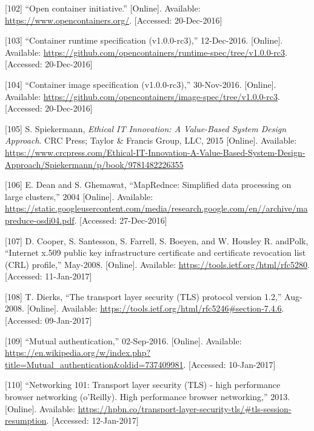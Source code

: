 \documentclass[12pt,english,a4paper,titlepage,cleardoublepage=empty,dottedtoc]{report}
\begin{document}
\hypertarget{ref-web_2016_open-container-initiative}{}
{[}102{]} ``Open container initiative.'' {[}Online{]}. Available:
\url{https://www.opencontainers.org/}. {[}Accessed: 20-Dec-2016{]}

\hypertarget{ref-web_oci-spec_runtime}{}
{[}103{]} ``Container runtime specification (v1.0.0-rc3),'' 12-Dec-2016.
{[}Online{]}. Available:
\url{https://github.com/opencontainers/runtime-spec/tree/v1.0.0-rc3}.
{[}Accessed: 20-Dec-2016{]}

\hypertarget{ref-web_oci-spec_image}{}
{[}104{]} ``Container image specification (v1.0.0-rc3),'' 30-Nov-2016.
{[}Online{]}. Available:
\url{https://github.com/opencontainers/image-spec/tree/v1.0.0-rc3}.
{[}Accessed: 20-Dec-2016{]}

\hypertarget{ref-book_2015_ethical-it-innovation}{}
{[}105{]} S. Spiekermann, \emph{Ethical IT Innovation: A Value-Based
System Design Approach}. CRC Press; Taylor \& Francis Group, LLC, 2015
{[}Online{]}. Available:
\url{https://www.crcpress.com/Ethical-IT-Innovation-A-Value-Based-System-Design-Approach/Spiekermann/p/book/9781482226355}

\hypertarget{ref-paper_2004_distributed-mapreduce}{}
{[}106{]} E. Dean and S. Ghemawat, ``MapRednce: Simplified data
processing on large clusters,'' 2004 {[}Online{]}. Available:
\url{https://static.googleusercontent.com/media/research.google.com/en//archive/mapreduce-osdi04.pdf}.
{[}Accessed: 27-Dec-2016{]}

\hypertarget{ref-web_spec_x509}{}
{[}107{]} D. Cooper, S. Santesson, S. Farrell, S. Boeyen, and W. Housley
R. andPolk, ``Internet x.509 public key infrastructure certificate and
certificate revocation list (CRL) profile,'' May-2008. {[}Online{]}.
Available: \url{https://tools.ietf.org/html/rfc5280}. {[}Accessed:
11-Jan-2017{]}

\hypertarget{ref-web_spec_tls-12_client-auth}{}
{[}108{]} T. Dierks, ``The transport layer security (TLS) protocol
version 1.2,'' Aug-2008. {[}Online{]}. Available:
\url{https://tools.ietf.org/html/rfc5246\#section-7.4.6}. {[}Accessed:
09-Jan-2017{]}

\hypertarget{ref-web_2017_wikipedia_mutual-auth}{}
{[}109{]} ``Mutual authentication,'' 02-Sep-2016. {[}Online{]}.
Available:
\url{https://en.wikipedia.org/w/index.php?title=Mutual_authentication\&oldid=737409981}.
{[}Accessed: 10-Jan-2017{]}

\hypertarget{ref-book_2013_networking-101_tls-session-resumption}{}
{[}110{]} ``Networking 101: Transport layer security (TLS) - high
performance browser networking (o'Reilly). High performance browser
networking,'' 2013. {[}Online{]}. Available:
\url{https://hpbn.co/transport-layer-security-tls/\#tls-session-resumption}.
{[}Accessed: 12-Jan-2017{]}
\end{document}

